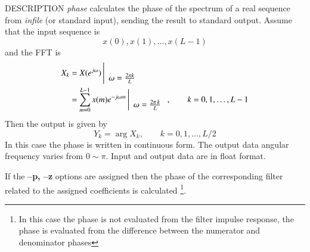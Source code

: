 \begin{synopsis}
\item[phase] [ --l $L$ ] [ --p {\em pfile} ] [ --z {\em zfile} ]
             [ --m $M$ ] [ --n $N$ ] [ {\em infile} ]
\end{synopsis}

\begin{qsection}{DESCRIPTION}
{\em phase} calculates the phase of the spectrum of a real sequence 
from {\em infile} (or standard input), 
sending the result to standard output.
Assume that the input sequence is
\begin{displaymath}
  x(0), x(1), \dots, x(L-1)
\end{displaymath}
and the FFT is
\begin{align}
  X_k &= X(e^{j\omega}) \left|
	\begin{array}{c}
	\\
        \omega=\frac{2\pi k}{L}
	\end{array}
    \right. \notag \\
         &= \sum_{m=0}^{L-1}x(m)e^{-j\omega m} \left|
	\begin{array}{c}
	\\
        \omega=\frac{2\pi\, k}{L}
	\end{array}
    \right.,\qquad k=0,1,\dots,L-1 \notag
\end{align}
Then the output is given by
\begin{displaymath}
  Y_k=\arg X_k, \qquad k=0,1,\dots,L/2
\end{displaymath}
In this case the phase is written in continuous form.
The output data angular frequency varies from $0\sim \pi$.
Input and output data are in float format.
\par
If the {\bf --p, --z} options are assigned
then the phase of the corresponding filter related to
the assigned coefficients is calculated
\footnote{
In this case the phase is not evaluated from the filter
impulse response, the phase is evaluated from
the difference between the numerator and denominator phases}.
\end{qsection}

